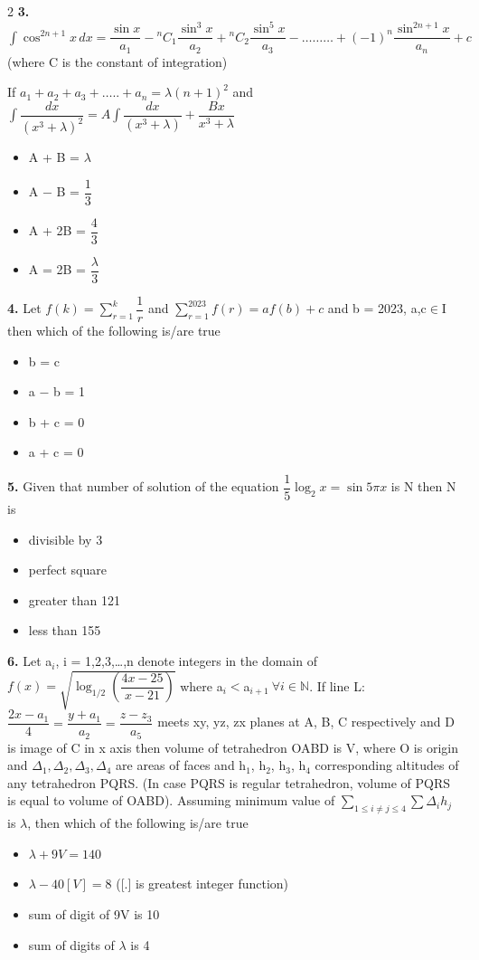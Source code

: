\documentclass[10pt]{extarticle}
\newenvironment{qoptions}{\begin{itemize}[leftmargin=1.8em,itemsep=2pt,topsep=2pt,label={}]}{\end{itemize}}
\newcommand{\opt}[2]{\item[({#1})] {#2}}
\begin{document}
\begin{multicols}{2}
\textbf{3.} $\displaystyle\int\cos^{2n+1}x\,dx=\dfrac{\sin x}{a_1}-{}^n C_1\dfrac{\sin^3x}{a_2}+{}^nC_2\dfrac{\sin^5x}{a_3}-\ldots\ldots\ldots+(-1)^n\dfrac{\sin^{2n+1}x}{a_n}+c$ (where C is the constant of integration)

If $a_1+a_2+a_3+\ldots..+a_n=\lambda(n+1)^2$ and $\displaystyle\int\dfrac{dx}{(x^3+\lambda)^2}=A\displaystyle\int\dfrac{dx}{(x^3+\lambda)}+\dfrac{Bx}{x^3+\lambda}$

\begin{qoptions}
\opt{A}{A + B = $\lambda$}
\opt{B}{A $-$ B = $\dfrac13$}
\opt{C}{A + 2B = $\dfrac43$}
\opt{D}{A = 2B = $\dfrac\lambda3$}
\end{qoptions}

\textbf{4.} Let $f(k)=\displaystyle\sum_{r=1}^k\dfrac1r$ and $\displaystyle\sum_{r=1}^{2023}f(r)=af(b)+c$ and b = 2023, a,c$\in$I then which of the following is/are true

\begin{qoptions}
\opt{A}{b = c}
\opt{B}{a $-$ b = 1}
\opt{C}{b + c = 0}
\opt{D}{a + c = 0}
\end{qoptions}

\textbf{5.} Given that number of solution of the equation $\dfrac15\log_2x=\sin5\pi x$ is N then N is

\begin{qoptions}
\opt{A}{divisible by 3}
\opt{B}{perfect square}
\opt{C}{greater than 121}
\opt{D}{less than 155}
\end{qoptions}

\textbf{6.} Let a$_i$, i = 1,2,3,\ldots,n denote integers in the domain of $f(x)=\sqrt{\log_{1/2}\left(\dfrac{4x-25}{x-21}\right)}$ where a$_i<$a$_{i+1}\ \forall i\in\mathbb N$. If line L: $\dfrac{2x-a_1}4=\dfrac{y+a_1}{a_2}=\dfrac{z-z_3}{a_5}$ meets xy, yz, zx planes at A, B, C respectively and D is image of C in x axis then volume of tetrahedron OABD is V, where O is origin and $\Delta_1,\Delta_2,\Delta_3,\Delta_4$ are areas of faces and h$_1$, h$_2$, h$_3$, h$_4$ corresponding altitudes of any tetrahedron PQRS. (In case PQRS is regular tetrahedron, volume of PQRS is equal to volume of OABD). Assuming minimum value of $\displaystyle\sum_{1\le i\ne j\le4}\sum\Delta_ih_j$ is $\lambda$, then which of the following is/are true

\begin{qoptions}
\opt{A}{$\lambda+9V=140$}
\opt{B}{$\lambda-40[V]=8$ ([.] is greatest integer function)}
\opt{C}{sum of digit of 9V is 10}
\opt{D}{sum of digits of $\lambda$ is 4}
\end{qoptions}


\end{multicols}
\end{document}
